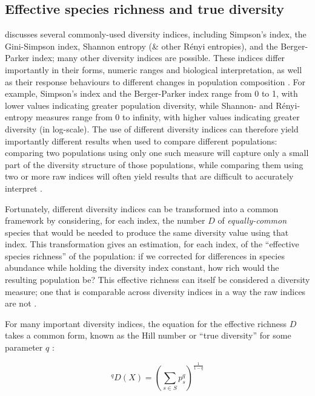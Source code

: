 \subsection{Effective species richness and true diversity}
\label{app:diversity-unitary-hill}

 discusses several commonly-used diversity indices, including Simpson's index, the Gini-Simpson index, Shannon entropy (\& other R\'{e}nyi entropies), and the Berger-Parker index; many other diversity indices are possible. These indices differ importantly in their forms, numeric ranges and biological interpretation, as well as their response behaviours to different changes in population composition \citep{peet1974diversity, jost2006entropy}. For example, Simpson's index and the Berger-Parker index range from 0 to 1, with lower values indicating greater population diversity, while Shannon- and R\'{e}nyi-entropy measures range from 0 to infinity, with higher values indicating greater diversity (in log-scale). The use of different diversity indices can therefore yield importantly different results when used to compare different populations: comparing two populations using only one such measure will capture only a small part of the diversity structure of those populations, while comparing them using two or more raw indices will often yield results that are difficult to accurately interpret \citep{peet1974diversity, jost2006entropy}.

Fortunately, different diversity indices can be transformed into a common framework by considering, for each index, the number $D$ of \textit{equally-common} species that would be needed to produce the same diversity value using that index. This transformation gives an estimation, for each index, of the ``effective species richness'' of the population: if we corrected for differences in species abundance while holding the diversity index constant, how rich would the resulting population be? This effective richness can itself be considered a diversity measure; one that is comparable across diversity indices in a way the raw indices are not \citep{jost2006entropy}.

For many important diversity indices, the equation for the effective richness $D$ takes a common form, known as the Hill number or ``true diversity'' for some parameter $q$ \citep{hill1973diversity, jost2006entropy}:

\begin{equation}
^qD(X) = \left(\sum_{s \in S} p_s^q \right)^{\frac{1}{1-q}}
\label{eq:hill_index}
\end{equation}


